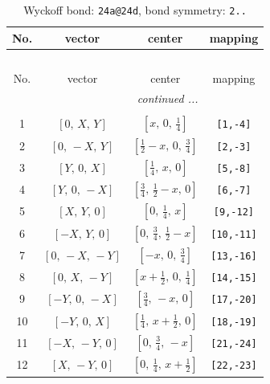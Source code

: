 \documentclass[fleqn,8pt]{jsarticle}
\begin{document}
\begin{longtable}{cccc}
\caption{Wyckoff bond: {\tt 24a@24d}, bond symmetry: {\tt 2..}}
 \\
 \hline \hline
No. & vector & center & mapping \\ \hline \endfirsthead

\multicolumn{3}{l}{\tablename\ \thetable{}} \\
 \hline \hline
No. & vector & center & mapping \\ \hline \endhead

 \hline \hline
\multicolumn{3}{r}{\footnotesize\it continued ...} \\ \endfoot

 \hline \hline
\multicolumn{3}{r}{} \\ \endlastfoot

1 & $\left[ 0,\, X,\, Y \right]$ & $\left[ x,\, 0,\, \frac{1}{4} \right]$ & {\tt [1,-4]} \\ \hline
2 & $\left[ 0,\, - X,\, Y \right]$ & $\left[ \frac{1}{2} - x,\, 0,\, \frac{3}{4} \right]$ & {\tt [2,-3]} \\ \hline
3 & $\left[ Y,\, 0,\, X \right]$ & $\left[ \frac{1}{4},\, x,\, 0 \right]$ & {\tt [5,-8]} \\ \hline
4 & $\left[ Y,\, 0,\, - X \right]$ & $\left[ \frac{3}{4},\, \frac{1}{2} - x,\, 0 \right]$ & {\tt [6,-7]} \\ \hline
5 & $\left[ X,\, Y,\, 0 \right]$ & $\left[ 0,\, \frac{1}{4},\, x \right]$ & {\tt [9,-12]} \\ \hline
6 & $\left[ - X,\, Y,\, 0 \right]$ & $\left[ 0,\, \frac{3}{4},\, \frac{1}{2} - x \right]$ & {\tt [10,-11]} \\ \hline
7 & $\left[ 0,\, - X,\, - Y \right]$ & $\left[ - x,\, 0,\, \frac{3}{4} \right]$ & {\tt [13,-16]} \\ \hline
8 & $\left[ 0,\, X,\, - Y \right]$ & $\left[ x + \frac{1}{2},\, 0,\, \frac{1}{4} \right]$ & {\tt [14,-15]} \\ \hline
9 & $\left[ - Y,\, 0,\, - X \right]$ & $\left[ \frac{3}{4},\, - x,\, 0 \right]$ & {\tt [17,-20]} \\ \hline
10 & $\left[ - Y,\, 0,\, X \right]$ & $\left[ \frac{1}{4},\, x + \frac{1}{2},\, 0 \right]$ & {\tt [18,-19]} \\ \hline
11 & $\left[ - X,\, - Y,\, 0 \right]$ & $\left[ 0,\, \frac{3}{4},\, - x \right]$ & {\tt [21,-24]} \\ \hline
12 & $\left[ X,\, - Y,\, 0 \right]$ & $\left[ 0,\, \frac{1}{4},\, x + \frac{1}{2} \right]$ & {\tt [22,-23]} \\
\end{longtable}
\end{document}
